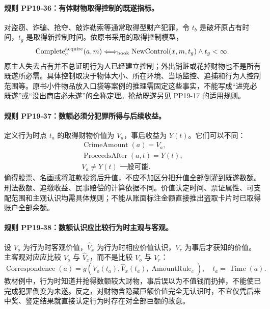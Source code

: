 \paragraph{规则 PP19-36：有体财物取得控制的既遂指标。}
\mbox{}\par
对盗窃、诈骗、抢夺、敲诈勒索等通常取得型财产犯罪，令 $t_b$ 是破坏原占有时间，$t_g$ 是取得新控制时间。依原书采用的取得控制模型，
\[
\operatorname{Complete}^{\rm acquire}_c(a,m)
\Longleftrightarrow_{\rm book}
\operatorname{NewControl}(x,m,t_g)\land t_g<\infty.
\]
原主人失去占有并不总证明行为人已经建立控制；外出销赃或花掉财物也不是所有既遂所必需。具体控制取决于物体大小、所在环境、当场监控、追捕和行为人控制范围等。原书小件物品放入口袋等案例的推理需固定这些事实，不能写成“进兜必既遂”或“没出商店必未遂”的全称定理。抢劫既遂另见 PP19-17 的适用规则。

\paragraph{规则 PP19-37：数额必须分犯罪所得与后续收益。}
\mbox{}\par
定义行为时点 $t_a$ 的取得财物价值为 $V_a$，事后收益为 $Y(t)$。它们可以不同：
\[
\begin{gathered}
\operatorname{CrimeAmount}(a)=V_a,\\
\operatorname{ProceedsAfter}(a,t)=Y(t),\\
V_a\ne Y(t)\text{ 一般可能}.
\end{gathered}
\]
偷得股票、名画或将赃款投资后升值，不应不加区分把升值全部倒灌到既遂数额。刑法数额、追缴收益、民事赔偿的计算依据不同。价值认定时间、票证属性、可支配范围和主观认识均需具体规则；不能从账面标注金额直接推出盗取卡片时已取得账户全部余额。

\paragraph{规则 PP19-38：数额认识应比较行为时主观与客观。}
\mbox{}\par
设 $V_o$ 为行为时客观价值，$\widehat V_x$ 为行为时相应价值认识，$V_r$ 为事后才获知的价值。主客观对应应比较 $V_o$ 与 $\widehat V_x$，而不是比较 $V_o$ 与 $V_r$：
\[
\operatorname{Correspondence}(a)
=g(V_o(t_a),\widehat V_x(t_a),\operatorname{AmountRule}_c),
\quad t_a=\operatorname{Time}(a).
\]
教材例中，行为时知道并抢得数额较大财物，事后误以为不值钱而扔掉，不能使已完成犯罪倒变为未遂。反之，对财物含隐藏巨额价值完全无认识时，不宜仅凭后来中奖、鉴定结果就直接认定行为时存在对全部巨额的故意。

